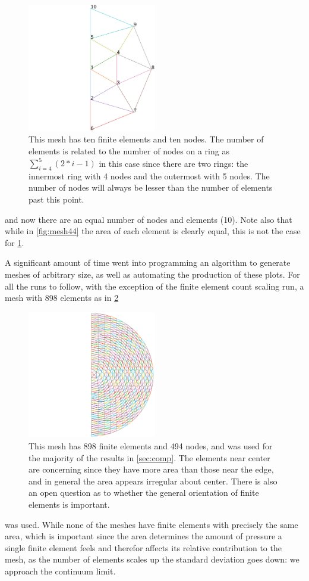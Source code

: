 \documentclass[12pt,times,twocolumn,3p]{elsarticle}
\begin{document}
\begin{figure}[h]
    \centering
    \includegraphics[width=0.5\textwidth]{./mesh_45.pdf}
    \caption{This mesh has ten finite elements and ten nodes. The number of
    elements is related to the number of nodes on a ring as
    $\sum_{i=4}^{5}(2*i-1)$ in this case since there are two rings: the innermost
    ring with 4 nodes and the outermost with 5 nodes. The number of nodes
    will always be lesser than the number of elements past this point.}
    \label{fig:mesh45}
\end{figure}
and now there are an equal number of nodes and elements (10). Note also that while
in \cref{fig:mesh44} the area of each element is clearly equal, this is not the
case for \cref{fig:mesh45}.

A significant amount of time went into programming an algorithm to generate meshes
of arbitrary size, as well as automating the production of these plots. For all
the runs to follow, with the exception of the finite element count scaling run,
a mesh with 898 elements as in \cref{fig:meshm}
\begin{figure}[h]
    \centering
    \includegraphics[width=0.5\textwidth]{./mesh_max.pdf}
    \caption{This mesh has 898 finite elements and 494 nodes, and was used for
    the majority of the results in \cref{sec:comp}. The elements near
    center are concerning since they have more area than those near the edge, and
    in general the area appears irregular about center. There is also an open question
    as to whether the general orientation of finite elements is important.}
    \label{fig:meshm}
\end{figure}
was used. While none of the meshes have finite elements with precisely the same
area, which is important since the area determines the amount of pressure a single
finite element feels and therefor affects its relative contribution to the mesh, as
the number of elements scales up the standard deviation goes down: we approach the continuum
limit.
\end{document}

